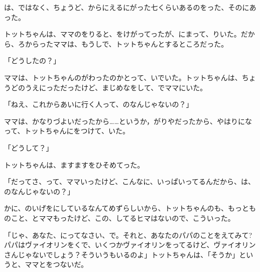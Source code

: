 は、ではなく、ちょうど、からにえるにがった七くらいあるのをった、そのにあった。

トットちゃんは、ママのをりると、をけがってったが、にまって、りいた。だから、ろからったママは、もうしで、トットちゃんとするところだった。

「どうしたの？」

ママは、トットちゃんのがわったのかとって、いでいた。トットちゃんは、ちょうどのうえにっただったけど、まじめなをして、でママにいた。

「ねえ、これからあいに行く人って、のなんじゃないの？」

ママは、かなりづよいだったから……というか，がりやだったから、やはりになって、トットちゃんにをつけて、いた。

「どうして？」

トットちゃんは、ますますをひそめてった。

「だってさ、って、ママいったけど、こんなに、いっぱいってるんだから、は、のなんじゃないの？」

かに、のいげをにしているなんてめずらしいから、トットちゃんのも、もっとものこと、とママもったけど、この、してるヒマはないので、こういった。

「じゃ、あなた、にってなさい、で。それと、あなたのパパのことをえてみて?パパはヴァイオリンをくで、いくつかヴァイオリンをってるけど、ヴァイオリンさんじゃないでしょう？そういうもいるのよ」トットちゃんは、「そうか」というと、ママとをつないだ。